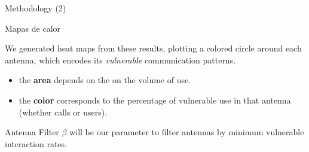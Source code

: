 \documentclass{beamer}
\begin{document}
\begin{frame}{Methodology (2)}


	\begin{block}{Mapas de calor}


		We generated heat maps from these results, plotting a colored circle around each antenna, which encodes its \textit{vulnerable} communication patterns.


		\begin{itemize}
			\item the \textbf{area} depends on the on the volume of use.
			\item the \textbf{color} corresponds to the percentage of vulnerable use in that antenna (whether calls or users).
		\end{itemize}

	\end{block}

	\begin{block}{Antenna Filter}
		$\beta$ will be our parameter to filter antennas by minimum vulnerable interaction rates.


\end{block}
\end{frame}
\end{document}
